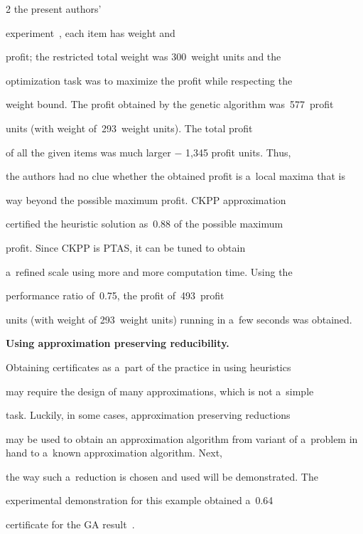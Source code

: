 \begin{multicols}{2}
the present authors'


experiment~\cite{link-to-the-sofware-cite}, each item has weight and


profit; the restricted total weight was 300~weight units and the


optimization task was to maximize the profit while respecting the


weight bound. The profit obtained by the genetic algorithm was~577~profit


units (with weight of~293~weight units). The total profit


of all the given items was much larger $-$ 1,345 profit units. Thus,


the authors had no clue whether the obtained profit is a~local maxima that is


way beyond the possible maximum profit. {CKPP} approximation


certified the heuristic solution as~0.88 of the possible maximum


profit. Since {CKPP} is {PTAS}, it can be tuned to obtain


a~refined scale using more and more computation time. Using the


performance ratio of~0.75,  the profit of~493~profit


units (with weight of 293~weight units) running in a~few seconds was obtained.





\noindent


\textbf{Using approximation preserving reducibility.}


Obtaining certificates as a~part of the practice in using heuristics


may require the design of many approximations, which is not a~simple


task. Luckily, in some cases, approximation preserving reductions


may be used to obtain an approximation algorithm from variant of a~problem in hand to a~known approximation algorithm. Next,


the way such a~reduction is chosen and used will be demonstrated. The


experimental demonstration for this example obtained a~0.64


certificate for the {GA} result~\cite{link-to-the-sofware-cite}.






\end{multicols}

